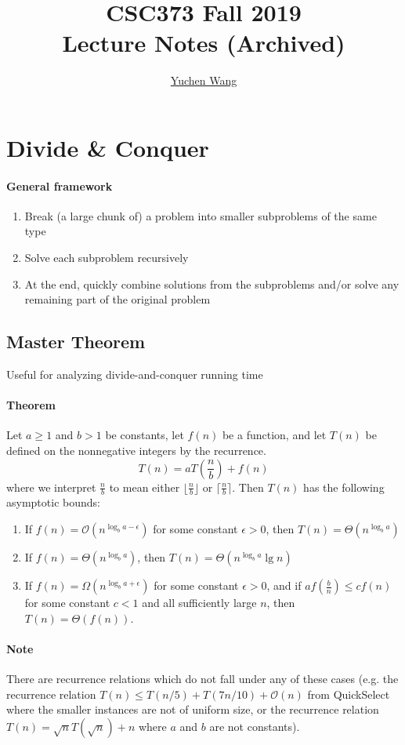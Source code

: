 \documentclass[11pt]{article}
\title{CSC373 Fall 2019 \\ Lecture Notes (Archived)}
\author{\textcolor{blue}{\href{https://www.yuchenwyc.com}{Yuchen Wang}}}
\begin{document}
    \maketitle
    \tableofcontents
    \newpage
\section{Divide \& Conquer}
\paragraph{General framework}
\begin{enumerate}
	\item Break (a large chunk of) a problem into smaller subproblems of the same type
	\item Solve each subproblem recursively
	\item At the end, quickly combine solutions from the subproblems and/or solve any remaining part of the original problem
\end{enumerate}
\subsection{Master Theorem}
Useful for analyzing divide-and-conquer running time
\paragraph{Theorem}
Let $a \geq 1$ and $b > 1$ be constants, let $f(n)$ be a function, and let $	T(n)$ be defined on the nonnegative integers by the recurrence.
$$T(n) = aT(\frac{n}{b}) + f(n)$$
where we interpret $\frac{n}{b}$ to mean either $\lfloor \frac{n}{b} \rfloor$ or $\lceil \frac{n}{b} \rceil$. Then $T(n)$ has the following asymptotic bounds:
\begin{enumerate}
	\item If $f(n) = \mathcal{O}(n^{\log_b{a-\epsilon}})$ for some constant $\epsilon > 0$, then $T(n) = \Theta(n^{\log_b a})$
	\item If $f(n) = \Theta(n^{\log_b a})$, then $T(n) = \Theta(n^{\log_b a} \lg n)$
	\item If $f(n) = \Omega(n^{\log_b{a+\epsilon}})$ for some constant $\epsilon > 0$, and if $af(\frac{b}{n}) \leq cf(n)$ for some constant $c < 1$ and all sufficiently large $n$, then $T(n) = \Theta(f(n))$.	
\end{enumerate}

\paragraph{Note}
There are recurrence relations which do not fall under any of these cases (e.g. the recurrence relation $T(n) \leq T(n/5) + T(7n/10) + \mathcal{O}(n)$ from QuickSelect where the smaller instances are not of uniform size, or the recurrence relation $T(n) = \sqrt{n}T(\sqrt{n}) + n$ where $a$ and $b$ are not constants).
\end{document}
